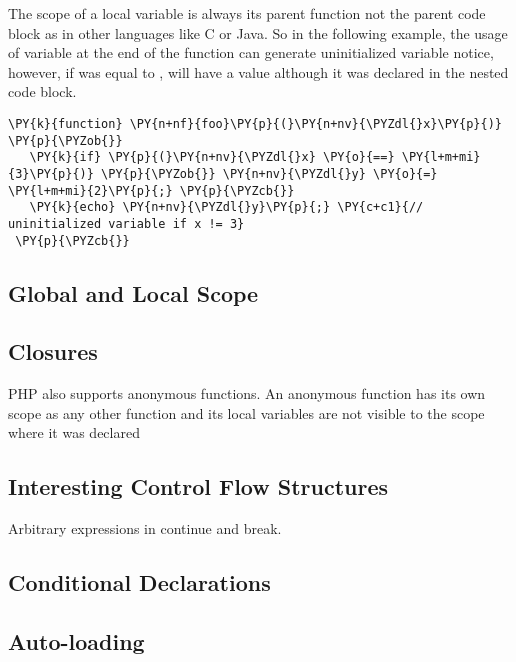     The scope of a local variable is always its parent function not the 
    parent code block as in other languages like C or Java. So in the following 
    example, the usage of variable  at the end of the function 
    can generate uninitialized variable notice, however, if  
    was equal to ,  will have a value although it 
    was declared in the nested code block.

\begin{Verbatim}[commandchars=\\\{\}]
 \PY{k}{function} \PY{n+nf}{foo}\PY{p}{(}\PY{n+nv}{\PYZdl{}x}\PY{p}{)} \PY{p}{\PYZob{}}
   \PY{k}{if} \PY{p}{(}\PY{n+nv}{\PYZdl{}x} \PY{o}{==} \PY{l+m+mi}{3}\PY{p}{)} \PY{p}{\PYZob{}} \PY{n+nv}{\PYZdl{}y} \PY{o}{=} \PY{l+m+mi}{2}\PY{p}{;} \PY{p}{\PYZcb{}}
   \PY{k}{echo} \PY{n+nv}{\PYZdl{}y}\PY{p}{;} \PY{c+c1}{// uninitialized variable if x != 3}
 \PY{p}{\PYZcb{}}
\end{Verbatim}
    
    \subsection{Global and Local Scope}

    \subsection{Closures}
    PHP also supports anonymous functions. An anonymous function has its 
    own scope as any other function and its local variables are not visible 
    to the scope where it was declared

    \subsection{Interesting Control Flow Structures}
    Arbitrary expressions in continue and break.
    
    \subsection{Conditional Declarations}
                
    \subsection{Auto-loading}
    
